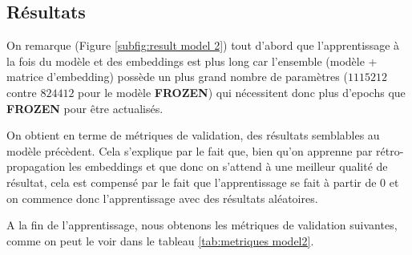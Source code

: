 \documentclass[a4paper]{article}
\begin{document}
\subsection{Résultats}


On remarque (Figure \ref{subfig:result model 2}) tout d'abord que l'apprentissage à la fois du modèle et des embeddings est plus long car l'ensemble (modèle + matrice d'embedding) possède un plus grand nombre de paramètres ($1115212$ contre $824412$ pour le modèle \textbf{FROZEN}) qui nécessitent donc plus d'epochs que \textbf{FROZEN} pour être actualisés.

On obtient en terme de métriques de validation, des résultats semblables au modèle précèdent. Cela s'explique par le fait que, bien qu'on apprenne par rétro-propagation les embeddings et que donc on s'attend à une meilleur qualité de résultat, cela est compensé par le fait que l'apprentissage se fait à partir de 0 et on commence donc l'apprentissage avec des résultats aléatoires.

A la fin de l'apprentissage, nous obtenons les métriques de validation suivantes, comme on peut le voir dans le tableau \ref{tab:metriques model2}.
\end{document}
